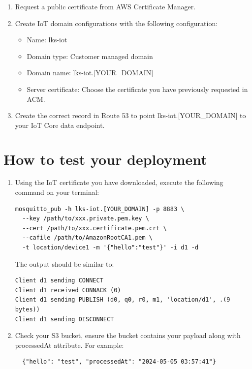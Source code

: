 \documentclass{article}
\begin{document}
\begin{enumerate}
\begin{itemize}
  \end{itemize}
\item Request a public certificate from AWS Certificate Manager.
\item Create IoT domain configurations with the following configuration:
  \begin{itemize}
    \item Name: lks-iot
    \item Domain type: Customer managed domain
    \item Domain name: lks-iot.[YOUR\_DOMAIN]
    \item Server certificate: Choose the certificate you have previously requested in ACM.
  \end{itemize}
\item Create the correct record in Route 53 to point lks-iot.[YOUR\_DOMAIN] to your IoT Core data endpoint.
\end{enumerate}
\section{How to test your deployment}
\begin{enumerate}
  \item Using the IoT certificate you have downloaded, execute the following command on your terminal:
    \begin{lstlisting}
mosquitto_pub -h lks-iot.[YOUR_DOMAIN] -p 8883 \
  --key /path/to/xxx.private.pem.key \
  --cert /path/to/xxx.certificate.pem.crt \
  --cafile /path/to/AmazonRootCA1.pem \
  -t location/device1 -m '{"hello":"test"}' -i d1 -d
    \end{lstlisting}
    The output should be similar to:
    \begin{lstlisting}
Client d1 sending CONNECT
Client d1 received CONNACK (0)
Client d1 sending PUBLISH (d0, q0, r0, m1, 'location/d1', .(9 bytes))
Client d1 sending DISCONNECT
    \end{lstlisting}
  \item Check your S3 bucket, ensure the bucket contains your payload along with processedAt attribute.
  For example:
  \begin{lstlisting}
  {"hello": "test", "processedAt": "2024-05-05 03:57:41"}
  \end{lstlisting}
\end{enumerate}
\end{document}
